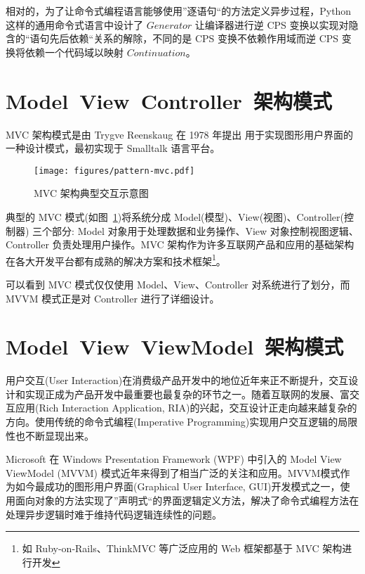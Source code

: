 相对的，为了让命令式编程语言能够使用”逐语句“的方法定义异步过程，Python 这样的通用命令式语言中设计了 $Generator$ 让编译器进行逆 CPS 变换以实现对隐含的“语句先后依赖“关系的解除，不同的是 CPS 变换不依赖作用域而逆 CPS 变换将依赖一个代码域以映射 $Continuation$。

\section{Model~View~Controller~架构模式}

MVC 架构模式是由 Trygve Reenskaug 在 1978 年提出\cite{reenskaug1979thing} 用于实现图形用户界面的一种设计模式，最初实现于 Smalltalk 语言平台。

\begin{figure}[!h]
\begin{center}
\texttt{[image: figures/pattern-mvc.pdf]}
\caption{MVC 架构典型交互示意图\label{MVCOverview}}
\end{center}
\end{figure}

典型的 MVC 模式(如图~\ref{MVCOverview})将系统分成 Model(模型)、View(视图)、Controller(控制器) 三个部分: Model 对象用于处理数据和业务操作、View 对象控制视图逻辑、Controller 负责处理用户操作。MVC 架构作为许多互联网产品和应用的基础架构在各大开发平台都有成熟的解决方案和技术框架\footnote{如 Ruby-on-Rails、ThinkMVC 等广泛应用的 Web 框架都基于 MVC 架构进行开发}。

可以看到 MVC 模式仅仅使用 Model、View、Controller 对系统进行了划分，而 MVVM 模式正是对 Controller 进行了详细设计。

\section{Model~View~ViewModel~架构模式}

用户交互(User Interaction)在消费级产品开发中的地位近年来正不断提升，交互设计和实现正成为产品开发中最重要也最复杂的环节之一。随着互联网的发展、富交互应用(Rich Interaction Application, RIA)的兴起，交互设计正走向越来越复杂的方向。使用传统的命令式编程(Imperative Programming)实现用户交互逻辑的局限性也不断显现出来。

Microsoft 在 Windows Presentation Framework (WPF) 中引入的 Model View ViewModel (MVVM) 模式近年来得到了相当广泛的关注和应用。MVVM模式作为如今最成功的图形用户界面(Graphical User Interface, GUI)开发模式之一，使用面向对象的方法实现了”声明式“的界面逻辑定义方法，解决了命令式编程方法在处理异步逻辑时难于维持代码逻辑连续性的问题。

